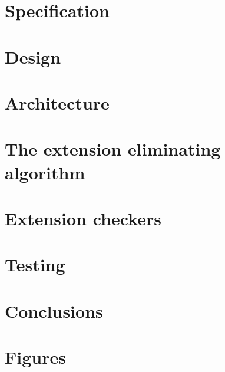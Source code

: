 \documentclass[12pt,a4paper,twoside]{report}
\begin{document}
		\chapter{Specification}
		
		
		\chapter{Design}
		
		
		\chapter{Architecture}
		
				
		\chapter{The extension eliminating algorithm} \label{algorithm}
		
			
		\chapter{Extension checkers} \label{checkers}
		
		
		\chapter{Testing}
		

	\chapter{Conclusions}
	
	
	\appendix
	\chapter{Figures}
	
	
	\begin{spacing}{0.2}
		
	\end{spacing}
	
\end{document}
